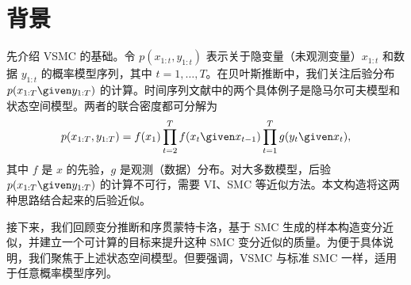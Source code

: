 \section{背景}
先介绍 VSMC 的基础。令 $p(x_{1:t},y_{1:t})$ 表示关于隐变量（未观测变量）$x_{1:t}$ 和数据 $y_{1:t}$ 的概率模型序列，其中 $t=1,\ldots,T$。在贝叶斯推断中，我们关注后验分布 $p(x_{1:T}\given y_{1:T})$ 的计算。时间序列文献中的两个具体例子是隐马尔可夫模型和状态空间模型\citep{cappe2005inference}。两者的联合密度都可分解为
\begin{align*}
p(x_{1:T},y_{1:T})=f(x_1)\prod_{t=2}^T f(x_t\given x_{t-1})\prod_{t=1}^T g(y_t\given x_t),
\end{align*}
其中 $f$ 是 $x$ 的先验，$g$ 是观测（数据）分布。对大多数模型，后验 $p(x_{1:T}\given y_{1:T})$ 的计算不可行，需要 VI、SMC 等近似方法。本文构造将这两种思路结合起来的后验近似。

接下来，我们回顾变分推断和序贯蒙特卡洛，基于 SMC 生成的样本构造变分近似，并建立一个可计算的目标来提升这种 SMC 变分近似的质量。为便于具体说明，我们聚焦于上述状态空间模型。但要强调，VSMC 与标准 SMC 一样，适用于任意概率模型序列\citep{del2006sequential,doucet2009tutorial,Naesseth2014}。
